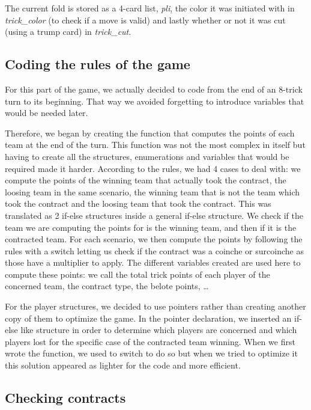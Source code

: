 \documentclass[12pt]{article}
\begin{document}
The current fold is stored as a 4-card list, \textit{pli}, the color it was initiated with in \textit{trick\_color} (to check if a move is valid) and lastly whether or not it was cut (using a trump card) in \textit{trick\_cut}.

\subsection{Coding the rules of the game}

For this part of the game, we actually decided to code from the end of an 8-trick turn to its beginning. That way we avoided forgetting to introduce variables that would be needed later.

Therefore, we began by creating the function that computes the points of each team at the end of the turn.
This function was not the most complex in itself but having to create all the structures, enumerations and variables that would be required made it harder.
According to the rules, we had 4 cases to deal with: we compute the points of the winning team that actually took the contract, the loosing team in the same scenario, the winning team that is not the team which took the contract and the loosing team that took the contract.
This was translated as 2 if-else structures inside a general if-else structure.
We check if the team we are computing the points for is the winning team, and then if it is the contracted team.
For each scenario, we then compute the points by following the rules with a switch letting us check if the contract was a coinche or surcoinche as those have a multiplier to apply.
The different variables created are used here to compute these points: we call the total trick points of each player of the concerned team, the contract type, the belote points, …

For the player structures, we decided to use pointers rather than creating another copy of them to optimize the game.
In the pointer declaration, we inserted an if-else like structure in order to determine which players are concerned and which players lost for the specific case of the contracted team winning.
When we first wrote the function, we used to switch to do so but when we tried to optimize it this solution appeared as lighter for the code and more efficient.

\subsection{Checking contracts}
\end{document}
